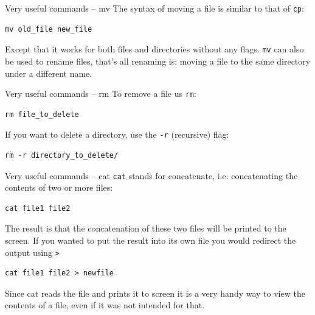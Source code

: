 \documentclass[10pt]{beamer}
\begin{document}
\begin{frame}[label={sec:orga6ef8b2},fragile]{Very useful commands -- mv}
 The syntax of moving a file is similar to that of \texttt{cp}:

\begin{verbatim}
mv old_file new_file
\end{verbatim}

Except that it works for both files and directories without any flags. \texttt{mv} can
also be used to \alert{rename} files, that's all renaming is: moving a file to the same
directory under a different name.
\end{frame}

\begin{frame}[label={sec:org0c1cbf9},fragile]{Very useful commands -- rm}
 To remove a file us \texttt{rm}:

\begin{verbatim}
rm file_to_delete
\end{verbatim}

If you want to delete a directory, use the \texttt{-r} (recursive) flag:

\begin{verbatim}
rm -r directory_to_delete/
\end{verbatim}
\end{frame}

\begin{frame}[label={sec:org35c0d9b},fragile]{Very useful commands -- cat}
 \texttt{cat} stands for concatenate, i.e. concatenating the contents of two or more
files:

\begin{verbatim}
cat file1 file2
\end{verbatim}

The result is that the concatenation of these two files will be printed to the
screen. If you wanted to put the result into its own file you would redirect the
output using \texttt{>}

\begin{verbatim}
cat file1 file2 > newfile
\end{verbatim}

Since cat reads the file and prints it to screen it is a very handy way to view
the contents of a file, even if it was not intended for that.
\end{frame}
\end{document}
